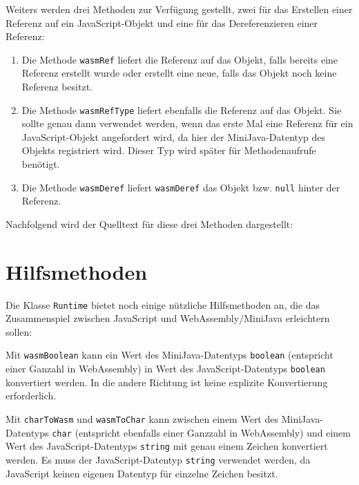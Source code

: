 Weiters werden drei Methoden zur Verfügung gestellt, zwei für das Erstellen einer Referenz auf ein JavaScript-Objekt und eine für das Dereferenzieren einer Referenz:
\begin{enumerate}
    \item Die Methode \lstinline{wasmRef} liefert die Referenz auf das Objekt, falls bereits eine Referenz erstellt wurde oder erstellt eine neue, falls das Objekt noch keine Referenz besitzt.
    \item Die Methode \lstinline{wasmRefType} liefert ebenfalls die Referenz auf das Objekt. Sie sollte genau dann verwendet werden, wenn das erste Mal eine Referenz für ein Ja\-va\-Script-Ob\-jekt angefordert wird, da hier der MiniJava-Datentyp des Objekts registriert wird. Dieser Typ wird später für Methodenaufrufe benötigt.
    \item Die Methode \lstinline{wasmDeref} liefert \lstinline{wasmDeref} das Objekt bzw. \lstinline{null} hinter der Referenz.
\end{enumerate}

Nachfolgend wird der Quelltext für diese drei Methoden dargestellt:



\section{Hilfsmethoden}

Die Klasse \lstinline{Runtime} bietet noch einige nützliche Hilfsmethoden an, die das Zusammenspiel zwischen JavaScript und WebAssembly/MiniJava erleichtern sollen:



Mit \lstinline{wasmBoolean} kann ein Wert des MiniJava-Datentyps \lstinline{boolean} (entspricht einer Ganzahl in WebAssembly) in Wert des JavaScript-Datentyps \lstinline{boolean} konvertiert werden. In die andere Richtung ist keine explizite Konvertierung erforderlich.

Mit \lstinline{charToWasm} und \lstinline{wasmToChar} kann zwischen einem Wert des MiniJava-Datentyps \lstinline{char} (entspricht ebenfalls einer Ganzzahl in WebAssembly) und einem Wert des Ja\-va\-Script-Da\-ten\-typs \lstinline{string} mit genau einem Zeichen konvertiert werden.
Es muss der JavaScript-Datentyp \lstinline{string} verwendet werden, da JavaScript keinen eigenen Datentyp für einzelne Zeichen besitzt.

